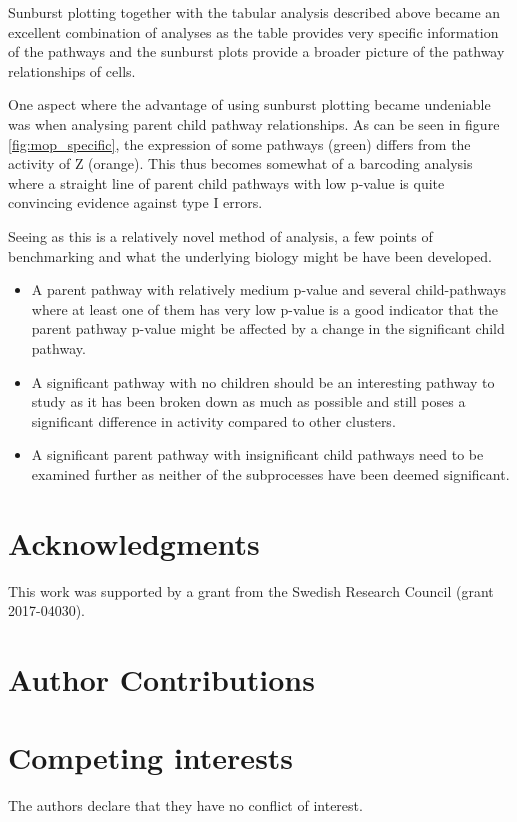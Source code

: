 \documentclass[11pt]{article}
\begin{document}
  Sunburst plotting together with the tabular analysis described above became an excellent combination of analyses as the table provides very specific information of the pathways and the sunburst plots provide a broader picture of the pathway relationships of cells.

  One aspect where the advantage of using sunburst plotting became undeniable was when analysing parent child pathway relationships. As can be seen in figure \ref{fig:mop_specific}, the expression of some pathways (green) differs from the activity of Z (orange). This thus becomes somewhat of a barcoding analysis where a straight line of parent child pathways with low p-value is quite convincing evidence against type I errors.

  Seeing as this is a relatively novel method of analysis, a few points of benchmarking and what the underlying biology might be have been developed.

  \begin{itemize}
      \item A parent pathway with relatively medium p-value and several child-pathways where at least one of them has very low p-value is a good indicator that the parent pathway p-value might be affected by a change in the significant child pathway.
      \item A significant pathway with no children should be an interesting pathway to study as it has been broken down as much as possible and still poses a significant difference in activity compared to other clusters.
      \item A significant parent pathway with insignificant child pathways need to be examined further as neither of the subprocesses have been deemed significant.
    \end{itemize}

\section*{Acknowledgments}

This work was supported by a grant from the Swedish Research Council (grant
2017-04030).

\section*{Author Contributions}

\section*{Competing interests}

The authors declare that they have no conflict of interest.

\printbibliography[title=References]
\end{document}
